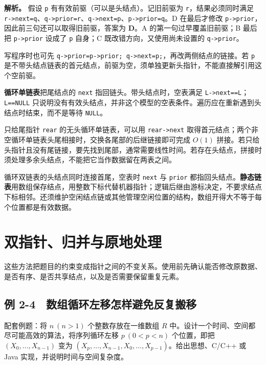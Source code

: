\textbf{解析。} 假设 \texttt{p} 有有效前驱（可以是头结点）。记旧前驱为 \texttt{r}，结果必须同时满足 \texttt{r->\allowbreak{}next=\allowbreak{}q}、\texttt{q->\allowbreak{}prior=\allowbreak{}r}、\texttt{q->\allowbreak{}next=\allowbreak{}p}、\texttt{p->\allowbreak{}prior=\allowbreak{}q}。D 在最后才修改 \texttt{p->\allowbreak{}prior}，因此前三句还可以取得旧前驱，答案为 \textbf{D}。A 的第一句过早覆盖旧前驱；B 最后把 \texttt{p->\allowbreak{}prior} 设成了 \texttt{p} 自身；C 既改错方向，又使用尚未设置的 \texttt{q->\allowbreak{}prior}。

写程序时也可先 \texttt{q->\allowbreak{}prior=\allowbreak{}p->\allowbreak{}prior;\allowbreak{} q->\allowbreak{}next=\allowbreak{}p;\allowbreak{}}，再改两侧结点的链接。若 \texttt{p} 是不带头结点链表的首元结点，前驱为空，须单独更新头指针，不能直接解引用这个空前驱。

\textbf{循环单链表}把尾结点的 \texttt{next} 指回链头。带头结点时，空表满足 \texttt{L->\allowbreak{}next=\allowbreak{}=\allowbreak{}L}；\texttt{L=\allowbreak{}=\allowbreak{}NULL} 只说明没有有效头结点，并非这个模型的空表条件。遍历应在重新遇到头结点时结束，而不是等待 \texttt{NULL}。

只给尾指针 \texttt{rear} 的无头循环单链表，可以用 \texttt{rear->\allowbreak{}next} 取得首元结点；两个非空循环单链表头尾相接时，交换各尾部的后继链接即可完成 \(O(1)\) 拼接。若只给头指针且没有尾链接，要先找到尾部，通常需要线性时间。若存在头结点，拼接时须处理多余头结点，不能把它当作数据留在两表之间。

循环双链表的头结点同时连接首尾，空表时 \texttt{next} 与 \texttt{prior} 都指回头结点。\textbf{静态链表}用数组保存结点，用整数下标代替机器指针；逻辑后继由游标决定，不要求结点下标相邻。还须维护空闲结点链或其他管理空闲位置的结构，数组开得大不等于每个位置都是有效数据。

\section{双指针、归并与原地处理}\label{DS02-05}

这些方法把题目的约束变成指针之间的不变关系。使用前先确认能否修改原数据、是否有序、是否共享结点，以及是否需要保留重复元素。

\subsection{例 2-4　数组循环左移怎样避免反复搬移}\label{DS02-ex4}

\begin{example}[配套例题]

配套例题：将 \(n\ (n>1)\) 个整数存放在一维数组 \(R\) 中。设计一个时间、空间都尽可能高效的算法，将序列循环左移 \(p\ (0<p<n)\) 个位置，即把 \((X_0,\ldots,X_{n-1})\) 变为 \((X_p,\ldots,X_{n-1},X_0,\ldots,X_{p-1})\)。给出思想、C/C++ 或 Java 实现，并说明时间与空间复杂度。

\end{example}

